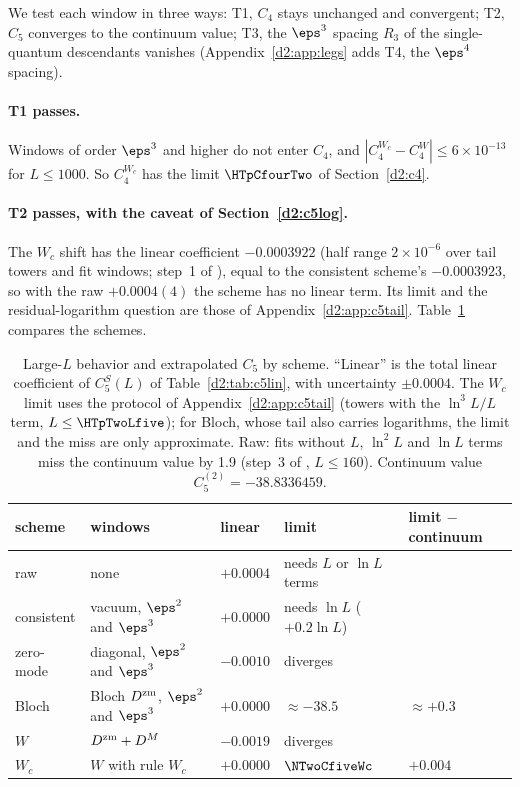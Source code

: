 We test each window in three ways: T1, $C_4$ stays unchanged and convergent; T2, $C_5$ converges to the continuum value; T3,
the $\eps^3$ spacing $R_3$ of the single-quantum descendants vanishes (Appendix~\ref{d2:app:legs} adds T4, the $\eps^4$
spacing).

\paragraph{T1 passes.} Windows of order $\eps^3$ and higher do not enter $C_4$, and $|C_4^{W_c}-C_4^W|\le6\times10^{-13}$ for
$L\le1000$. So $C_4^{W_c}$ has the limit $\HTpCfourTwo$ of Section~\ref{d2:c4}.

\paragraph{T2 passes, with the caveat of Section~\ref{d2:c5log}.} The $W_c$ shift has the linear coefficient $-0.0003922$
(half range $2\times10^{-6}$ over tail towers and fit windows; step~1 of ), equal to the consistent
scheme's $-0.0003923$, so with the raw $+0.0004(4)$ the scheme has no linear term. Its limit and the residual-logarithm
question are those of Appendix~\ref{d2:app:c5tail}. Table~\ref{d2:tab:c5schemes} compares the schemes.

\begin{table}[ht]
\centering\footnotesize\renewcommand{\arraystretch}{1.15}
\begin{tabular}{@{}p{2.6cm}p{3.6cm}p{1.6cm}p{3.6cm}p{2.6cm}@{}}
\toprule
scheme & windows & linear & limit & limit $-$ continuum \\\midrule
raw & none & $+0.0004$ & needs $L$ or $\ln L$ terms & \\
consistent & vacuum, $\eps^2$ and $\eps^3$ & $+0.0000$ & needs $\ln L$ ($+0.2\ln L$) & \\
zero-mode & diagonal, $\eps^2$ and $\eps^3$ & $-0.0010$ & diverges & \\
Bloch & Bloch $D^{\rm zm}$, $\eps^2$ and $\eps^3$ & $+0.0000$ & ${\approx}-38.5$ & ${\approx}+0.3$ \\
$W$ & $D^{\rm zm}+D^M$ & $-0.0019$ & diverges & \\
$W_c$ & $W$ with rule $W_c$ & $+0.0000$ & $\NTwoCfiveWc$ & $+0.004$ \\
\bottomrule
\end{tabular}
\caption{Large-$L$ behavior and extrapolated $C_5$ by scheme. ``Linear'' is the total linear coefficient of $C_5^S(L)$ of
Table~\ref{d2:tab:c5lin}, with uncertainty $\pm0.0004$. The $W_c$ limit uses the protocol of
Appendix~\ref{d2:app:c5tail} (towers with the $\ln^3L/L$ term, $L\le\HTpTwoLfive$); for Bloch, whose tail also carries
logarithms, the limit and the miss are only approximate. Raw: fits without $L$, $\ln^2L$ and $\ln L$ terms miss the continuum
value by 1.9 (step~3 of , $L\le160$). Continuum value $C_5^{(2)}=-38.8336459$.}
\label{d2:tab:c5schemes}
\end{table}

